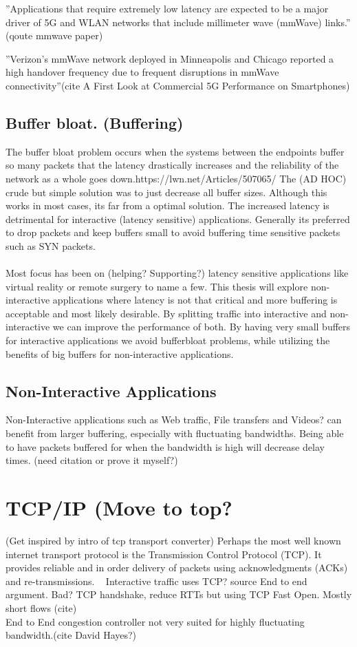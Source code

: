 \documentclass[a4paper,english, 11pt]{report}
\begin{document}
''Applications that require extremely low latency are
expected to be a major driver of 5G and WLAN networks that
include millimeter wave (mmWave) links.'' (qoute mmwave paper)

''Verizon’s mmWave network deployed in
Minneapolis and Chicago reported a high handover frequency
due to frequent disruptions in mmWave connectivity''(cite A First Look at Commercial 5G Performance on Smartphones)

\subsection{Buffer bloat. (Buffering)}
The buffer bloat problem occurs when the systems between the endpoints buffer so many packets that the latency drastically increases and the reliability of the network as a whole goes down.{https://lwn.net/Articles/507065/} The (AD HOC) crude but simple solution was to just decrease all buffer sizes. Although this works in most cases, its far from a optimal solution. The increased latency is detrimental for interactive (latency sensitive) applications. Generally its preferred to drop packets and keep buffers small to avoid buffering time sensitive packets such as SYN packets.\\\\

Most focus has been on (helping? Supporting?) latency sensitive applications like virtual reality or remote surgery to name a few. This thesis will explore non-interactive applications where latency is not that critical and more buffering is acceptable and most likely desirable. By splitting traffic into interactive and non-interactive we can improve the performance of both. By having very small buffers for interactive applications we avoid bufferbloat problems, while utilizing the benefits of big buffers for non-interactive applications.

\subsection{Non-Interactive Applications}
Non-Interactive applications such as Web traffic, File transfers and Videos? can benefit from larger buffering, especially with fluctuating bandwidths. Being able to have packets buffered for when the bandwidth is high will decrease delay times. (need citation or prove it myself?) 

\section{TCP/IP (Move to top?}
(Get inspired by intro of tcp transport converter)
Perhaps the most well known internet transport protocol is the Transmission Control Protocol (TCP). It provides reliable and in order delivery of packets using acknowledgments (ACKs) and re-transmissions. ~\cite{Eddy_2022}
Interactive traffic uses TCP? {source}
End to end argument. Bad?
TCP handshake, reduce RTTs but using TCP Fast Open. Mostly short flows (cite)
\\
End to End congestion controller not very suited for highly fluctuating bandwidth.(cite David Hayes?)
\end{document}
